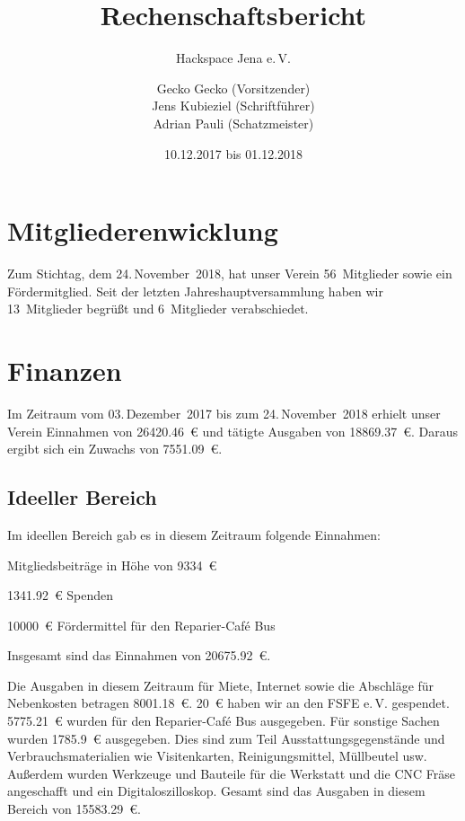 \documentclass[ngerman]{scrartcl}
\title{Rechenschaftsbericht}
\subtitle{Hackspace Jena e.\,V.}
\author{%
	Gecko Gecko (Vorsitzender)\\
	Jens Kubieziel (Schriftführer)\\
	Adrian Pauli (Schatzmeister)
}
\date{10.12.2017 bis 01.12.2018}
\begin{document}
\maketitle{}
\newpage

\tableofcontents{}

\newpage{}

\section{Mitgliederenwicklung}

Zum Stichtag, dem 24.\,November~2018, hat unser Verein 56~Mitglieder sowie ein Fördermitglied.
Seit der letzten Jahreshauptversammlung haben wir 13~Mitglieder begrüßt und 6~Mitglieder verabschiedet.

\section{Finanzen}

Im Zeitraum vom 03.\,Dezember~2017 bis zum 24.\,November~2018 erhielt unser Verein Einnahmen von \num{26420,46}~\euro{} und tätigte Ausgaben von \num{18869,37}~\euro{}.
Daraus ergibt sich ein Zuwachs von \num{7551,09}~\euro{}.


\subsection{Ideeller Bereich}
\label{sec:ideeller_bereich}

Im ideellen Bereich gab es in diesem Zeitraum folgende Einnahmen:
\begin{compactitem}
\item Mitgliedsbeiträge in Höhe von \num{9334}~\euro{}
\item \num{1341,92}~\euro{} Spenden
\item \num{10000}~\euro{} Fördermittel für den Reparier-Café Bus
\end{compactitem}
Insgesamt sind das Einnahmen von \num{20675,92}~\euro{}.

Die Ausgaben in diesem Zeitraum für Miete, Internet sowie die Abschläge für Nebenkosten betragen \num{8001,18}~\euro{}.
\num{20}~\euro{} haben wir an den FSFE e.\,V. gespendet.
\num{5775,21}~\euro{} wurden für den Reparier-Café Bus ausgegeben.
Für sonstige Sachen wurden \num{1785,9}~\euro{} ausgegeben.
Dies sind zum Teil Ausstattungsgegenstände und Verbrauchsmaterialien wie Visitenkarten, Reinigungsmittel, Müllbeutel usw.
Außerdem wurden Werkzeuge und Bauteile für die Werkstatt und die CNC Fräse angeschafft und ein Digitaloszilloskop.
Gesamt sind das Ausgaben in diesem Bereich von \num{15583,29}~\euro{}.
\end{document}
